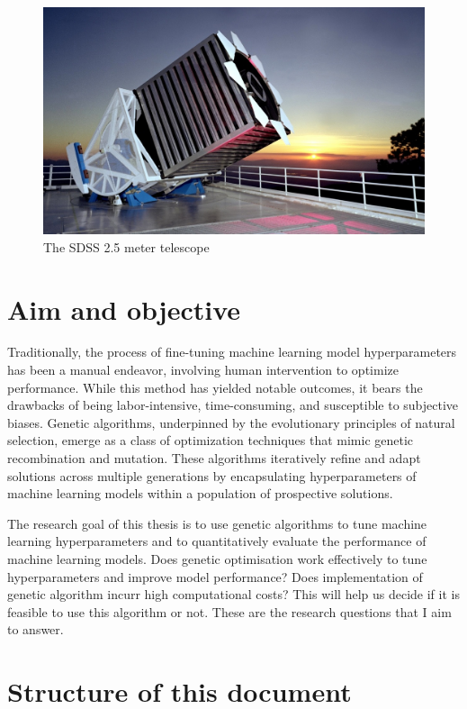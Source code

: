 \begin{figure}[H]
    \centering
    \includegraphics[scale=0.5]{images/sdss.jpeg}
    \caption{The SDSS 2.5 meter telescope \citep{sloanSloanDigital}}
    \label{fig:sdsstelescope}
\end{figure}

\section{Aim and objective}
Traditionally, the process of fine-tuning machine learning model hyperparameters has been a manual endeavor, involving human intervention to optimize performance. While this method has yielded notable outcomes, it bears the drawbacks of being labor-intensive, time-consuming, and susceptible to subjective biases. Genetic algorithms, underpinned by the evolutionary principles of natural selection, emerge as a class of optimization techniques that mimic genetic recombination and mutation. These algorithms iteratively refine and adapt solutions across multiple generations by encapsulating hyperparameters of machine learning models within a population of prospective solutions.

The research goal of this thesis is to use genetic algorithms to tune machine learning hyperparameters and to quantitatively evaluate the performance of machine learning models. Does genetic optimisation work effectively to tune hyperparameters and improve model performance? Does implementation of genetic algorithm incurr high computational costs? This will help us decide if it is feasible to use this algorithm or not. These are the research questions that I aim to answer.

\section{Structure of this document}

